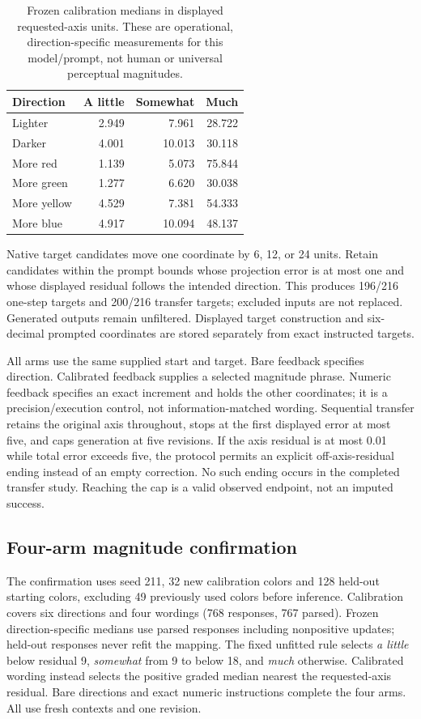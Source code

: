 \begin{table}[H]
\centering\small
\begin{tabular}{@{}lrrr@{}}
\toprule
Direction & A little & Somewhat & Much \\
\midrule
Lighter & 2.949 & 7.961 & 28.722 \\
Darker & 4.001 & 10.013 & 30.118 \\
More red & 1.139 & 5.073 & 75.844 \\
More green & 1.277 & 6.620 & 30.038 \\
More yellow & 4.529 & 7.381 & 54.333 \\
More blue & 4.917 & 10.094 & 48.137 \\
\bottomrule
\end{tabular}
\caption{Frozen calibration medians in displayed requested-axis units.
These are operational, direction-specific measurements for this model/prompt,
not human or universal perceptual magnitudes.}
\end{table}

Native target candidates move one coordinate by 6, 12, or 24 units.
Retain candidates within the prompt bounds whose projection error is at
most one and whose displayed residual follows the intended direction.
This produces 196/216 one-step targets and 200/216 transfer targets;
excluded inputs are not replaced. Generated outputs remain unfiltered.
Displayed target construction and six-decimal prompted coordinates are
stored separately from exact instructed targets.

All arms use the same supplied start and target. Bare feedback specifies
direction. Calibrated feedback supplies a selected magnitude phrase.
Numeric feedback specifies an exact increment and holds the other coordinates;
it is a precision/execution control, not information-matched wording.
Sequential transfer retains the original axis throughout, stops at the
first displayed error at most five, and caps generation at five revisions.
If the axis residual is at most 0.01 while total error exceeds five,
the protocol permits an explicit off-axis-residual ending instead of an
empty correction. No such ending occurs in the completed transfer study.
Reaching the cap is a valid observed endpoint, not an imputed success.

\subsection{Four-arm magnitude confirmation}
The confirmation uses seed 211, 32 new calibration colors and 128 held-out
starting colors, excluding 49 previously used colors before inference.
Calibration covers six directions and four wordings (768 responses, 767
parsed). Frozen direction-specific medians use parsed responses including
nonpositive updates; held-out responses never refit the mapping.
The fixed unfitted rule selects \textit{a little} below residual 9,
\textit{somewhat} from 9 to below 18, and \textit{much} otherwise.
Calibrated wording instead selects the positive graded median nearest the
requested-axis residual. Bare directions and exact numeric instructions
complete the four arms. All use fresh contexts and one revision.

